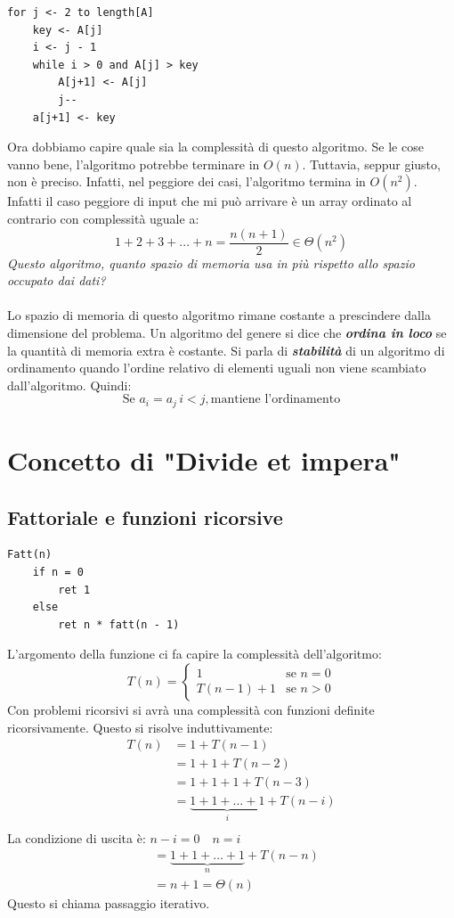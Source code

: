 \documentclass[a4paper]{article}
\begin{document}
\begin{lstlisting}
for j <- 2 to length[A]
    key <- A[j]
    i <- j - 1
    while i > 0 and A[j] > key
        A[j+1] <- A[j]
        j--
    a[j+1] <- key
\end{lstlisting}
Ora dobbiamo capire quale sia la complessità di questo algoritmo. Se le cose vanno bene, l'algoritmo potrebbe terminare in $O(n)$. Tuttavia, seppur giusto, non è preciso. Infatti, nel peggiore dei casi, l'algoritmo termina in $O(n^2)$. Infatti il caso peggiore di input che mi può arrivare è un array ordinato al contrario con complessità uguale a:
\[1 + 2 + 3 + ... + n = \frac{n(n+1)}{2} \in \Theta(n^2)\]
\textit{Questo algoritmo, quanto spazio di memoria usa in più rispetto allo spazio occupato dai dati? }
\\\\
Lo spazio di memoria di questo algoritmo rimane costante a prescindere dalla dimensione del problema. Un algoritmo del genere si dice che \textit{\textbf{ordina in loco}} se la quantità di memoria extra è costante. Si parla di \textit{\textbf{stabilità}} di un algoritmo di ordinamento quando l'ordine relativo di elementi uguali non viene scambiato dall'algoritmo. Quindi:
\[\text{Se } a_i = a_j \, i < j, \text{mantiene l'ordinamento}\]


\section{Concetto di "Divide et impera"}

\subsection{Fattoriale e funzioni ricorsive}

\begin{lstlisting}
Fatt(n)
    if n = 0
        ret 1
    else
        ret n * fatt(n - 1)
\end{lstlisting}

L'argomento della funzione ci fa capire la complessità dell'algoritmo:
\[
  T(n) = \begin{cases}
    1 & \text{se } n = 0 \\
    T(n - 1) + 1 & \text{se } n > 0
  \end{cases}
\]
Con problemi ricorsivi si avrà una complessità con funzioni definite ricorsivamente.
Questo si risolve induttivamente:
\[
  \begin{aligned}
    T(n) & = 1 + T(n-1)\\
         & = 1 + 1 + T(n-2)\\
         & = 1 + 1 + 1 + T(n-3)\\
         & = \underbrace{1 + 1 + \ldots + 1}_{i} + T(n-i)\\
  \end{aligned}
\]
La condizione di uscita è: \( n-i = 0 \quad n = i \)
\[
\begin{aligned}
         & = \underbrace{1 + 1 + \ldots + 1}_{n} + T(n-n)\\
         & = n + 1 = \Theta(n)
\end{aligned}
\]
Questo si chiama passaggio iterativo.
\end{document}

